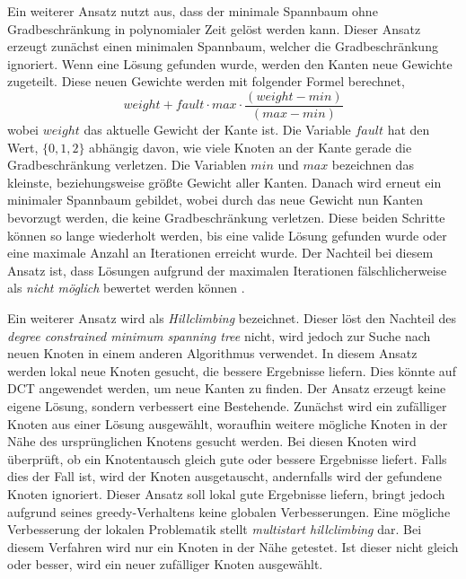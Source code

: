 Ein weiterer  Ansatz nutzt aus, dass der minimale Spannbaum ohne Gradbeschränkung in polynomialer Zeit gelöst werden kann.
Dieser Ansatz erzeugt zunächst einen minimalen Spannbaum, welcher die Gradbeschränkung ignoriert.
Wenn eine Lösung gefunden wurde, werden den Kanten neue Gewichte zugeteilt.
Diese neuen Gewichte werden mit folgender Formel berechnet,
\[
weight + fault \cdot max \cdot \frac{(weight - min)}{(max - min)}
\]
wobei \(weight\) das aktuelle Gewicht der Kante ist.
Die Variable \(fault\) hat den Wert, \(\{0,1,2\}\) abhängig davon, wie viele Knoten an der Kante gerade die Gradbeschränkung verletzen.
Die Variablen \(min\) und \(max\) bezeichnen das kleinste, beziehungsweise größte Gewicht aller Kanten.
Danach wird erneut ein minimaler Spannbaum gebildet, wobei durch das neue Gewicht nun Kanten bevorzugt werden, die keine Gradbeschränkung verletzen.
Diese beiden Schritte können so lange wiederholt werden, bis eine valide Lösung gefunden wurde oder eine maximale Anzahl an Iterationen erreicht wurde.
Der Nachteil bei diesem Ansatz ist, dass Lösungen aufgrund der maximalen Iterationen fälschlicherweise als \emph{nicht möglich} bewertet werden können .

Ein weiterer Ansatz wird als \emph{Hillclimbing} bezeichnet.
Dieser löst den Nachteil des \emph{degree constrained minimum spanning tree} nicht, wird jedoch zur Suche nach neuen Knoten in einem anderen Algorithmus verwendet.
In diesem Ansatz werden lokal neue Knoten gesucht, die bessere Ergebnisse liefern.
Dies könnte auf DCT angewendet werden, um neue Kanten zu finden.
Der Ansatz erzeugt keine eigene Lösung, sondern verbessert eine Bestehende.
Zunächst wird ein zufälliger Knoten aus einer Lösung ausgewählt, woraufhin weitere mögliche Knoten in der Nähe des ursprünglichen Knotens gesucht werden.
Bei diesen Knoten wird überprüft, ob ein Knotentausch gleich gute oder bessere Ergebnisse liefert.
Falls dies der Fall ist, wird der Knoten ausgetauscht, andernfalls wird der gefundene Knoten ignoriert.
Dieser Ansatz soll lokal gute Ergebnisse liefern, bringt jedoch aufgrund seines greedy-Verhaltens keine globalen Verbesserungen.
Eine mögliche Verbesserung der lokalen Problematik stellt \emph{multistart hillclimbing} dar.
Bei diesem Verfahren wird nur ein Knoten in der Nähe getestet.
Ist dieser nicht gleich oder besser, wird ein neuer zufälliger Knoten ausgewählt.

